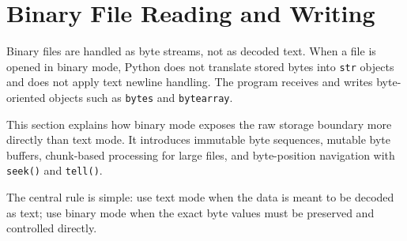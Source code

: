 \section{Binary File Reading and Writing}

Binary files are handled as byte streams, not as decoded text. When a file is opened in binary mode, Python does not translate stored bytes into \texttt{str} objects and does not apply text newline handling. The program receives and writes byte-oriented objects such as \texttt{bytes} and \texttt{bytearray}.

This section explains how binary mode exposes the raw storage boundary more directly than text mode. It introduces immutable byte sequences, mutable byte buffers, chunk-based processing for large files, and byte-position navigation with \texttt{seek()} and \texttt{tell()}.

The central rule is simple: use text mode when the data is meant to be decoded as text; use binary mode when the exact byte values must be preserved and controlled directly.
